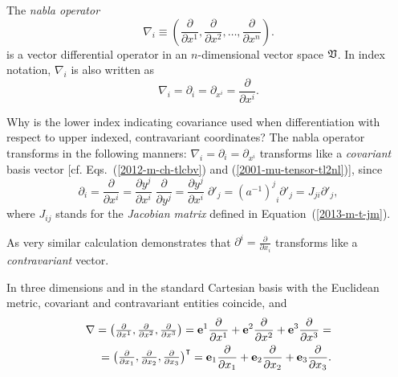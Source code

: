 The {\em nabla operator}
\begin{equation}
\nabla_i \equiv \left(
\frac{\partial }{\partial x^1},
\frac{\partial }{\partial x^2},
\ldots ,
\frac{\partial }{\partial x^n}
\right).
\end{equation}
is a vector differential operator in an $n$-dimensional vector space $\frak V$.
In index notation, $\nabla_i$ is also written as
\begin{equation}
\nabla_i  =\partial_i =\partial_{x^i}
= \frac{\partial }{\partial x^i}
.
\end{equation}

Why is the lower index indicating covariance used when differentiation with respect to upper indexed, contravariant coordinates?
The nabla operator transforms in the following manners:
$\nabla_i  =\partial_i =\partial_{x^i}$ transforms like a {\em covariant} basis vector
[cf. Eqs.~(\ref{2012-m-ch-tlcbv}) and (\ref{2001-mu-tensor-tl2nl})], since
\begin{equation}
\partial_i =
\frac{\partial }{\partial x^i}
=
\frac{\partial { y }^j}{\partial x^i}
\;
\frac{\partial }{\partial { y }^j}
=
\frac{\partial { y }^j}{\partial x^i}
\;
\partial'_j
=
{{\left(a^{-1}\right)}^j}_i
\partial'_j
=
J_{ji}
\partial'_j,
\end{equation}
where $J_{ij}$ stands for the {\em  Jacobian matrix} defined in Equation~(\ref{2013-m-t-jm}).

As very similar calculation demonstrates that $\partial^i=\frac{\partial }{\partial x_i}$ transforms like a {\em contravariant} vector.


In three dimensions and in the standard Cartesian basis with the Euclidean metric,
covariant and contravariant entities coincide,
and
\begin{equation}
\begin{split}
\nabla
=
\begin{pmatrix}
\frac{\partial }{\partial x^1},
\frac{\partial }{\partial x^2},
\frac{\partial }{\partial x^3}
\end{pmatrix}
={\bf e}^1\frac{\partial }{\partial x^1}
+{\bf e}^2\frac{\partial }{\partial x^2}
+{\bf e}^3\frac{\partial }{\partial x^3}
=
\\
= \begin{pmatrix}
\frac{\partial }{\partial x_1},
\frac{\partial }{\partial x_2},
\frac{\partial }{\partial x_3}
\end{pmatrix}^\intercal
={\bf e}_1\frac{\partial }{\partial x_1}
+{\bf e}_2\frac{\partial }{\partial x_2}
+{\bf e}_3\frac{\partial }{\partial x_3}
.
\end{split}
\end{equation}

